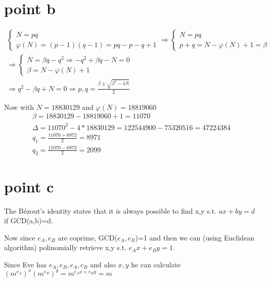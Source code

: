 \newpage
\section{point b}

\begin{gather*}
    \begin{cases}
        N=pq \\
        \varphi(N)=(p-1)(q-1)=pq-p-q+1
        \end{cases}
        \Rightarrow
    \begin{cases}
            N=pq\\
            p+q=N-\varphi(N)+1=\beta 
    \end{cases}\\
    \Rightarrow
    \begin{cases}
            N=\beta q -q^2 \Rightarrow -q^2+\beta q-N=0\\
            \beta=N-\varphi(N)+1
    \end{cases}\\
    \Rightarrow q^2-\beta q+N=0 \Rightarrow p,q=\frac{\beta \pm \sqrt{\beta^2-4N}}{2}
\end{gather*}

Now with $N= 18830129$ and $\varphi(N) = 18819060$\\

\begin{gather*}
    \beta=18830129 - 18819060 +1 = 11070\\
    \Delta=11070^2-4*18830129=122544900-75320516=47224384\\
    q_1=\frac{11070+6872}{2}=8971\\
    q_2=\frac{11070-6872}{2}=2099
\end{gather*}

\section{point c}

The Bézout’s identity states that it is always possible to find x,y s.t. 
$ax+by=d$ if GCD(a,b)=d.

Now since $e_A,e_B$ are coprime, GCD($e_A,e_B$)=1 and then we can (using Euclidean algorithm) polinomially retrieve x,y s.t. $e_A x + e_B y =1$.

Since Eve has $e_A,e_B,c_A,c_B$ and also $x,y$ he can calculate $(m^{e_A})^x (m^{e_B})^y=m^{e_A x + e_B y}=m$


